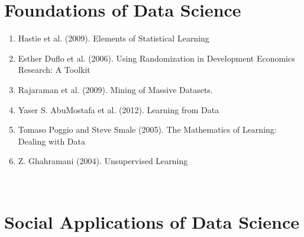 \section{Foundations of Data Science}
\begin{enumerate}   
\item  Hastie et al. (2009). Elements of Statistical Learning \cite{StatisticalLearning_2009}  
\item  Esther Duflo et al. (2006). Using Randomization in Development Economics Research: A Toolkit \cite{Duflo}   
\item  Rajaraman et al. (2009). Mining of Massive Datasets. \cite{Rajaraman_2009}  
\item  Yaser S. AbuMostafa et al. (2012). Learning from Data \cite{Abu-Mostafa:2012:LD:2207825}  
\item  Tomaso Poggio and Steve Smale (2005).  The Mathematics of Learning: Dealing with Data\cite{Poggio_2005} 
\item  Z. Ghahramani (2004).  Unsupervised Learning \cite{Ghahramani_2004}

\end{enumerate}  
\\
\section{Social Applications of Data Science}
 
\\  
